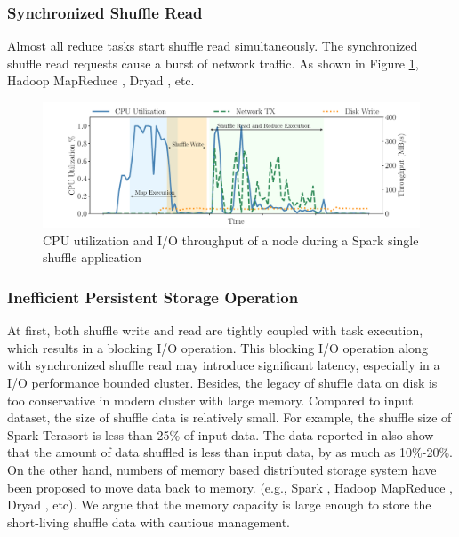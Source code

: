 \subsubsection{Synchronized Shuffle Read}
Almost all reduce tasks start shuffle read simultaneously. 
The synchronized shuffle read requests cause a burst of network traffic. 
As shown in Figure \ref{fig:util}, 
 Hadoop MapReduce \cite{hadoop}, Dryad \cite{dryad}, etc.

\begin{figure}
	\includegraphics[width=\linewidth]{fig/util}
	\caption{CPU utilization and I/O throughput of a node during a Spark single shuffle application}
	\label{fig:util}
	\vspace{-1em}
\end{figure}

\subsubsection{Inefficient Persistent Storage Operation}
At first, both shuffle write and read are tightly coupled with task execution, which results in a blocking I/O operation. 
This blocking I/O operation along with synchronized shuffle read may introduce significant latency, especially in a I/O performance bounded cluster.
Besides, the legacy of  shuffle data on disk is too conservative in modern cluster with large memory. 
Compared to input dataset, the size of shuffle data is relatively small. 
For example, the shuffle size of Spark Terasort \cite{spark-tera} is less than 25\% of input data. 
The data reported in \cite{makingsense} also show that the amount of data shuffled is less than input data, by as much as 10\%-20\%. 
\ifrevision
{}
\fi
On the other hand, numbers of memory based distributed storage system have been proposed \cite{memcached, tachyon, ramcloud} to move data back to memory. 
(e.g., Spark \cite{apachespark}, Hadoop MapReduce \cite{hadoop}, Dryad \cite{dryad}, etc).
We argue that the memory capacity is large enough to store the short-living shuffle data with cautious management.

